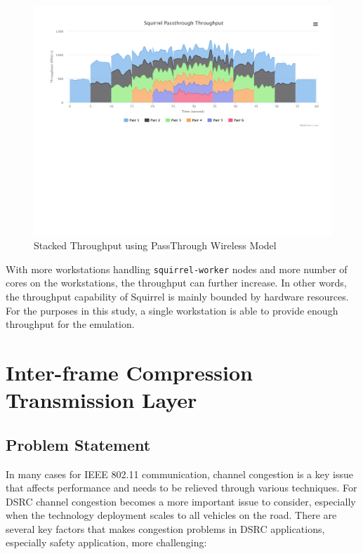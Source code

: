 \documentclass[12pt]{report}
\begin{document}
\begin{figure}[h]
  \includegraphics[width=\textwidth]{figures/results/passthrough.pdf}
  \caption{\label{fig:passthrough}Stacked Throughput using PassThrough Wireless Model}
\end{figure}

With more workstations handling \texttt{squirrel-worker} nodes and more number of cores on the workstations, the throughput can further increase. In other words, the throughput capability of Squirrel is mainly bounded by hardware resources. For the purposes in this study, a single workstation is able to provide enough throughput for the emulation.

\chapter{Inter-frame Compression Transmission Layer}

\section{Problem Statement}
\label{sec:problem_congestion}

In many cases for IEEE 802.11 communication, channel congestion is a key issue that affects performance and needs to be relieved through various techniques. For DSRC channel congestion becomes a more important issue to consider, especially when the technology deployment scales to all vehicles on the road. There are several key factors that makes congestion problems in DSRC applications, especially safety application, more challenging:
\end{document}
